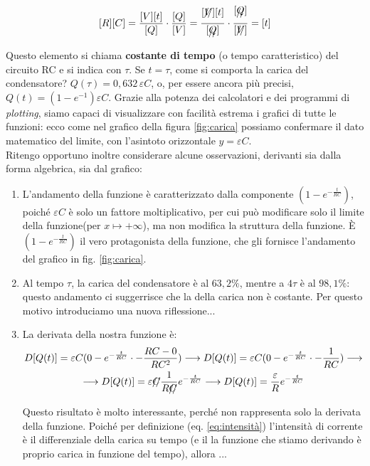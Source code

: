 \documentclass[a3paper, twoside, openany]{book}
\theoremstyle{definition}
\begin{document}
$$[R][C]=\frac{[V][t]}{[Q]}\cdot\frac{[Q]}{[V]}=\frac{[\xout{V}][t]}{[\xout{Q}]} \cdot \frac{[\xout{Q}]}{[\xout{V}]}=[t]$$ Questo elemento si chiama \textbf{costante di tempo} (o tempo caratteristico) del circuito RC e si indica con $\tau$. Se $t=\tau$, come si comporta la carica del condensatore? $Q(\tau)=0,632\,\varepsilon C$, o, per essere ancora più precisi, $Q(t)=\left(1-e^{-1}\right) \varepsilon C$. Grazie alla potenza dei calcolatori e dei programmi di \emph{plotting}, siamo capaci di visualizzare con facilità estrema i grafici di tutte le funzioni: ecco come nel grafico della figura \ref{fig:carica} possiamo confermare il dato matematico del limite, con l'asintoto orizzontale $y=\varepsilon C$. \\ Ritengo opportuno inoltre considerare alcune osservazioni, derivanti sia dalla forma algebrica, sia dal grafico: \begin{enumerate}
\item L'andamento della funzione è caratterizzato dalla componente $(1-e^{-\frac{t}{RC}})$, poiché $\varepsilon C$ è solo un fattore moltiplicativo, per cui può modificare solo il limite della funzione(per $x\mapsto +\infty$), ma non modifica la struttura della funzione. È $(1-e^{-\frac{t}{RC}})$ il vero protagonista della funzione, che gli fornisce l'andamento del grafico in fig. \ref{fig:carica}.
\item Al tempo $\tau$, la carica del condensatore è al $63,2\%$, mentre a $4\tau$ è al $98,1\%$: questo andamento ci suggerrisce che la  della carica non è costante. Per questo motivo introduciamo una nuova riflessione...
\item La derivata della nostra funzione è: \begin{multline*}D[Q(t)]=\varepsilon C (0-e^{-\frac{t}{RC}}\cdot-\frac{RC-0}{RC^2})\longrightarrow D[Q(t)]=\varepsilon C (0-e^{-\frac{t}{RC}}\cdot-\frac{1}{RC})\longrightarrow\\\longrightarrow D[Q(t)]=\varepsilon \xout{C}\frac{1}{R\xout{C}} e^{-\frac{t}{RC}}\longrightarrow D[Q(t)]=\frac{\varepsilon}{R} e^{-\frac{t}{RC}}\end{multline*} Questo risultato è molto interessante, perché non rappresenta solo la derivata della funzione. Poiché per definizione (eq. \ref{eq:intensità}) l'intensità di corrente è il differenziale della carica su tempo (e il la funzione che stiamo derivando è proprio carica in funzione del tempo), allora ...

\end{enumerate}
\end{document}
